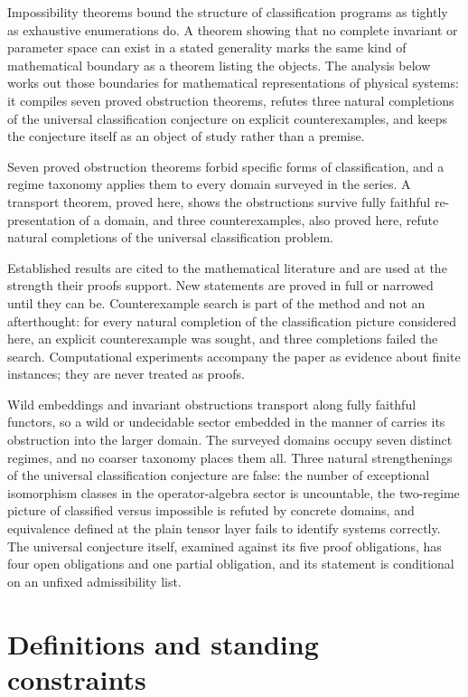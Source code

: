 \documentclass[11pt,letterpaper]{article}
\theoremstyle{definition}
\theoremstyle{remark}
\begin{document}
Impossibility theorems bound the structure of classification programs as tightly as exhaustive enumerations do. A theorem showing that no complete invariant or parameter space can exist in a stated generality marks the same kind of mathematical boundary as a theorem listing the objects. The analysis below works out those boundaries for mathematical representations of physical systems: it compiles seven proved obstruction theorems, refutes three natural completions of the universal classification conjecture on explicit counterexamples, and keeps the conjecture itself as an object of study rather than a premise.

Seven proved obstruction theorems forbid specific forms of classification, and a regime taxonomy applies them to every domain surveyed in the series. A transport theorem, proved here, shows the obstructions survive fully faithful re-presentation of a domain, and three counterexamples, also proved here, refute natural completions of the universal classification problem.

Established results are cited to the mathematical literature and are used at the strength their proofs support. New statements are proved in full or narrowed until they can be. Counterexample search is part of the method and not an afterthought: for every natural completion of the classification picture considered here, an explicit counterexample was sought, and three completions failed the search. Computational experiments accompany the paper as evidence about finite instances; they are never treated as proofs.

Wild embeddings and invariant obstructions transport along fully faithful functors, so a wild or undecidable sector embedded in the manner of  carries its obstruction into the larger domain. The surveyed domains occupy seven distinct regimes, and no coarser taxonomy places them all. Three natural strengthenings of the universal classification conjecture are false: the number of exceptional isomorphism classes in the operator-algebra sector is uncountable, the two-regime picture of classified versus impossible is refuted by concrete domains, and equivalence defined at the plain tensor layer fails to identify systems correctly. The universal conjecture itself, examined against its five proof obligations, has four open obligations and one partial obligation, and its statement is conditional on an unfixed admissibility list.

\section{Definitions and standing constraints}
\end{document}
